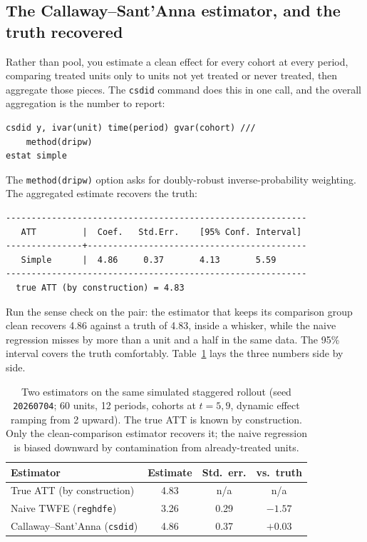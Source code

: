 \documentclass[
    a4paper,
    fontsize=10pt,
    twoside=true,
    numbers=noenddot,
]{kaobook}
\begin{document}
\subsection{The Callaway--Sant'Anna estimator, and the truth recovered}
Rather than pool, you estimate a clean effect for every cohort at every period, comparing treated units only to units not yet treated or never treated, then aggregate those pieces. The \texttt{csdid} command does this in one call, and the overall aggregation is the number to report:
\par
{\footnotesize
\begin{verbatim}
csdid y, ivar(unit) time(period) gvar(cohort) ///
    method(dripw)
estat simple
\end{verbatim}
}
The \texttt{method(dripw)} option asks for doubly-robust inverse-probability weighting. The aggregated estimate recovers the truth:
\par
{\footnotesize
\begin{verbatim}
-----------------------------------------------------------
   ATT         |  Coef.   Std.Err.    [95% Conf. Interval]
---------------+-------------------------------------------
   Simple      |  4.86     0.37       4.13       5.59
-----------------------------------------------------------
  true ATT (by construction) = 4.83
\end{verbatim}
}
Run the sense check on the pair: the estimator that keeps its comparison group clean recovers 4.86 against a truth of 4.83, inside a whisker, while the naive regression misses by more than a unit and a half in the same data. The 95\% interval covers the truth comfortably. Table~\ref{tab:did-compare} lays the three numbers side by side.

\begin{table}[htbp]
\centering
\caption[TWFE vs.\ Callaway--Sant'Anna on a known truth]{Two estimators on the same simulated staggered rollout (seed \texttt{20260704}; 60 units, 12 periods, cohorts at $t{=}5,9$, dynamic effect ramping from 2 upward). The true ATT is known by construction. Only the clean-comparison estimator recovers it; the naive regression is biased downward by contamination from already-treated units.}
\label{tab:did-compare}
{\footnotesize
\begin{tabular}{lccc}
\hline
Estimator & Estimate & Std.\ err. & vs.\ truth \\
\hline
True ATT (by construction) & 4.83 & n/a & n/a \\
Naive TWFE (\texttt{reghdfe}) & 3.26 & 0.29 & $-1.57$ \\
Callaway--Sant'Anna (\texttt{csdid}) & 4.86 & 0.37 & $+0.03$ \\
\hline
\end{tabular}
}
\end{table}
\end{document}

